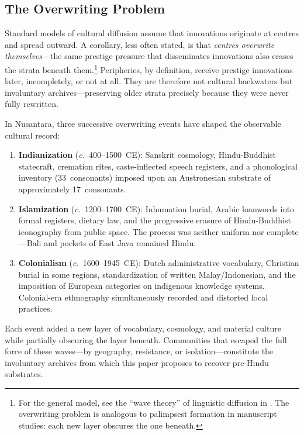\documentclass[12pt,a4paper]{article}
\begin{document}
\subsection{The Overwriting Problem}

Standard models of cultural diffusion assume that innovations originate at centres and spread outward. A corollary, less often stated, is that \emph{centres overwrite themselves}---the same prestige pressure that disseminates innovations also erases the strata beneath them.\footnote{For the general model, see the ``wave theory'' of linguistic diffusion in \autocite{blust1995austronesian}. The overwriting problem is analogous to palimpsest formation in manuscript studies: each new layer obscures the one beneath.} Peripheries, by definition, receive prestige innovations later, incompletely, or not at all. They are therefore not cultural backwaters but involuntary archives---preserving older strata precisely because they were never fully rewritten.

In Nusantara, three successive overwriting events have shaped the observable cultural record:

\begin{enumerate}
\item \textbf{Indianization} (\textit{c.}~400--1500~CE): Sanskrit cosmology, Hindu-Buddhist statecraft, cremation rites, caste-inflected speech registers, and a phonological inventory (33~consonants) imposed upon an Austronesian substrate of approximately 17~consonants.

\item \textbf{Islamization} (\textit{c.}~1200--1700~CE): Inhumation burial, Arabic loanwords into formal registers, dietary law, and the progressive erasure of Hindu-Buddhist iconography from public space. The process was neither uniform nor complete---Bali and pockets of East Java remained Hindu.

\item \textbf{Colonialism} (\textit{c.}~1600--1945~CE): Dutch administrative vocabulary, Christian burial in some regions, standardization of written Malay/Indonesian, and the imposition of European categories on indigenous knowledge systems. Colonial-era ethnography simultaneously recorded and distorted local practices.
\end{enumerate}

Each event added a new layer of vocabulary, cosmology, and material culture while partially obscuring the layer beneath. Communities that escaped the full force of these waves---by geography, resistance, or isolation---constitute the involuntary archives from which this paper proposes to recover pre-Hindu substrates.
\end{document}
